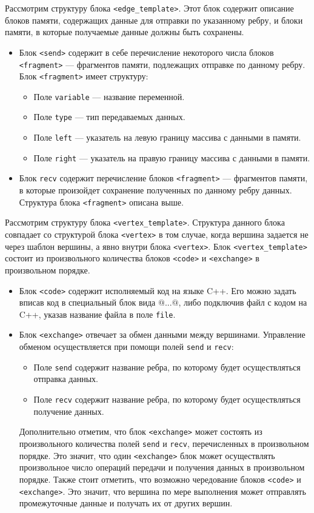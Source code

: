 \documentclass[a4paper, 12pt]{article}
\begin{document}
Рассмотрим структуру блока \lstinline$<edge_template>$. Этот блок содержит описание блоков памяти, содержащих данные для отправки по указанному ребру, и блоки памяти, в которые получаемые данные должны быть сохранены.
\begin{itemize}
	\item Блок \lstinline$<send>$ содержит в себе перечисление некоторого числа блоков \lstinline$<fragment>$ ---  фрагментов памяти, подлежащих отправке по данному ребру. Блок \lstinline$<fragment>$ имеет структуру:
		\begin{itemize}
			\item Поле \lstinline$variable$ --- название переменной.
			\item Поле \lstinline$type$ --- тип передаваемых данных.
			\item Поле \lstinline$left$ ---  указатель на левую границу массива с данными в памяти.
			\item Поле \lstinline$right$ ---  указатель на правую границу массива с данными в памяти.
		\end{itemize}
	 \item Блок \lstinline$recv$ содержит перечисление блоков \lstinline$<fragment>$ --- фрагментов памяти, в которые произойдет сохранение полученных по данному ребру данных. Структура блока \lstinline$<fragment>$ описана выше.
\end{itemize}
Рассмотрим структуру блока \lstinline$<vertex_template>$. Структура данного блока совпадает со структурой блока \lstinline$<vertex>$ в том случае, когда вершина задается не через шаблон вершины, а явно внутри блока \lstinline$<vertex>$. Блок \lstinline$<vertex_template>$ состоит из произвольного количества блоков \lstinline$<code>$ и \lstinline$<exchange>$ в произвольном порядке.
\begin{itemize}
	\item Блок \lstinline$<code>$ содержит исполняемый код на языке C++. Его можно задать вписав код в специальный блок вида $@$...$@$, либо подключив файл с кодом на C++, указав название файла в поле \lstinline$file$.
	\item Блок \lstinline$<exchange>$ отвечает за обмен данными между вершинами. Управление обменом осуществляется при помощи полей \lstinline$send$ и \lstinline$recv$:
	\begin{itemize}
		\item Поле \lstinline$send$ содержит название ребра, по которому будет осуществляться отправка данных.
		\item Поле \lstinline$recv$ содержит название ребра, по которому будет осуществляться получение данных.
	\end{itemize}
	Дополнительно отметим, что блок \lstinline$<exchange>$ может состоять из произвольного количества полей \lstinline$send$ и \lstinline$recv$, перечисленных в произвольном порядке. Это значит, что один \lstinline$<exchange>$ блок может осуществлять произвольное число операций передачи и получения данных в произвольном порядке. Также стоит отметить, что возможно чередование блоков \lstinline$<code>$ и \lstinline$<exchange>$. Это значит, что вершина по мере выполнения может отправлять промежуточные данные и получать их от других вершин.
\end{itemize}
\end{document}
